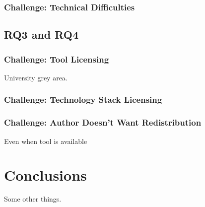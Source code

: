\documentclass{sig-alternate-05-2015}
\begin{document}
\subsubsection{Challenge: Technical Difficulties}

\subsection{RQ3 and RQ4}


\subsubsection{Challenge: Tool Licensing}

University grey area.

\subsubsection{Challenge: Technology Stack Licensing}

\subsubsection{Challenge: Author Doesn't Want Redistribution}

Even when tool is available

\section{Conclusions}

Some other things.





\end{document}
